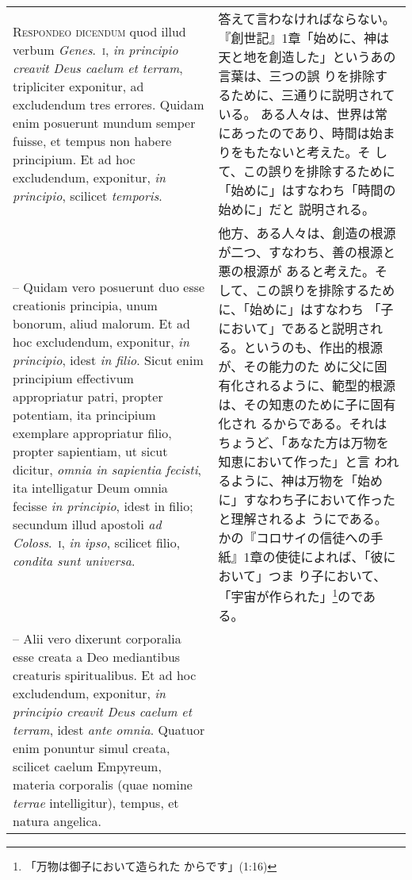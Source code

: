 \documentclass[10pt]{jsarticle} %
\begin{document}
\begin{longtable}{p{21em}p{21em}}
\\


{\scshape Respondeo dicendum} quod illud verbum {\itshape
Genes}.~{\scshape i}, {\itshape in principio creavit Deus caelum et
terram}, tripliciter exponitur, ad excludendum tres errores. Quidam enim
posuerunt mundum semper fuisse, et tempus non habere principium. Et ad
hoc excludendum, exponitur, {\itshape in principio}, scilicet {\itshape
temporis}.


&
答えて言わなければならない。
『創世記』1章「始めに、神は天と地を創造した」というあの言葉は、三つの誤
 りを排除するために、三通りに説明されている。
ある人々は、世界は常にあったのであり、時間は始まりをもたないと考えた。そ
 して、この誤りを排除するために「始めに」はすなわち「時間の始めに」だと
 説明される。

\\



-- Quidam vero posuerunt duo esse creationis principia, unum bonorum,
aliud malorum. Et ad hoc excludendum, exponitur, {\itshape in
principio}, idest {\itshape in filio}. Sicut enim principium effectivum
appropriatur patri, propter potentiam, ita principium exemplare
appropriatur filio, propter sapientiam, ut sicut dicitur, {\itshape
omnia in sapientia fecisti}, ita intelligatur Deum omnia fecisse
{\itshape in principio}, idest in filio; secundum illud apostoli
{\itshape ad Coloss}.~{\scshape i}, {\itshape in ipso}, scilicet filio,
{\itshape condita sunt universa}.

&

他方、ある人々は、創造の根源が二つ、すなわち、善の根源と悪の根源が
 あると考えた。そして、この誤りを排除するために、「始めに」はすなわち
 「子において」であると説明される。というのも、作出的根源が、その能力のた
 めに父に固有化されるように、範型的根源は、その知恵のために子に固有化され
 るからである。それはちょうど、「あなた方は万物を知恵において作った」と言
 われるように、神は万物を「始めに」すなわち子において作ったと理解されるよ
 うにである。かの『コロサイの信徒への手紙』1章の使徒によれば、「彼において」つま
 り子において、「宇宙が作られた」\footnote{「万物は御子において造られた
 からです」(1:16)}のである。

\\


-- Alii vero dixerunt corporalia esse creata a Deo mediantibus creaturis
spiritualibus. Et ad hoc excludendum, exponitur, {\itshape in principio
creavit Deus caelum et terram}, idest {\itshape ante omnia}. Quatuor
enim ponuntur simul creata, scilicet caelum Empyreum, materia corporalis
(quae nomine {\itshape terrae} intelligitur), tempus, et natura angelica.


\end{longtable}
\end{document}
